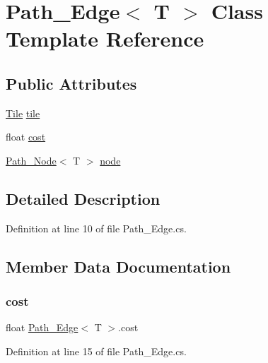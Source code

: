 \hypertarget{class_path___edge}{}\section{Path\+\_\+\+Edge$<$ T $>$ Class Template Reference}
\label{class_path___edge}
\subsection*{Public Attributes}
\begin{DoxyCompactItemize}
\item 
\hyperlink{class_tile}{Tile} \hyperlink{class_path___edge_ae23989633fd1a0059c1b390a1c829b82}{tile}
\item 
float \hyperlink{class_path___edge_abffb7d056110ca04b875836b1ea78d81}{cost}
\item 
\hyperlink{class_path___node}{Path\+\_\+\+Node}$<$ T $>$ \hyperlink{class_path___edge_a8b4cd5286457cab41ba744780a72369f}{node}
\end{DoxyCompactItemize}


\subsection{Detailed Description}


Definition at line 10 of file Path\+\_\+\+Edge.\+cs.



\subsection{Member Data Documentation}
\mbox{\label{class_path___edge_abffb7d056110ca04b875836b1ea78d81}} 
\subsubsection{\texorpdfstring{cost}{cost}}
{\footnotesize\ttfamily float \hyperlink{class_path___edge}{Path\+\_\+\+Edge}$<$ T $>$.cost}



Definition at line 15 of file Path\+\_\+\+Edge.\+cs.

\mbox{\label{class_path___edge_a8b4cd5286457cab41ba744780a72369f}} 
